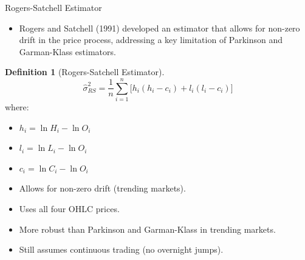 \documentclass[9pt, aspectratio=169, t]{beamer}
\theoremstyle{definition}
\newtheorem{defn}{Definition}
\begin{document}
\begin{frame}{Rogers-Satchell Estimator}

\begin{itemize}
    \item Rogers and Satchell (1991) developed an estimator that allows for non-zero drift in the price process, addressing a key limitation of Parkinson and Garman-Klass estimators.
\end{itemize}

\vspace{0.3cm}

\begin{defn}[Rogers-Satchell Estimator]
\[
\hat{\sigma}_{RS}^2 = \frac{1}{n}\sum_{i=1}^{n}\bigl[h_i(h_i - c_i) + l_i(l_i - c_i)\bigr]
\]
where:
\begin{itemize}
    \item $h_i = \ln H_i - \ln O_i$
    \item $l_i = \ln L_i - \ln O_i$
    \item $c_i = \ln C_i - \ln O_i$
\end{itemize}
\end{defn}

\vspace{0.3cm}

\begin{itemize}
    \item Allows for non-zero drift (trending markets).
    \item Uses all four OHLC prices.
    \item More robust than Parkinson and Garman-Klass in trending markets.
    \item Still assumes continuous trading (no overnight jumps).
\end{itemize}

\end{frame}
\end{document}
